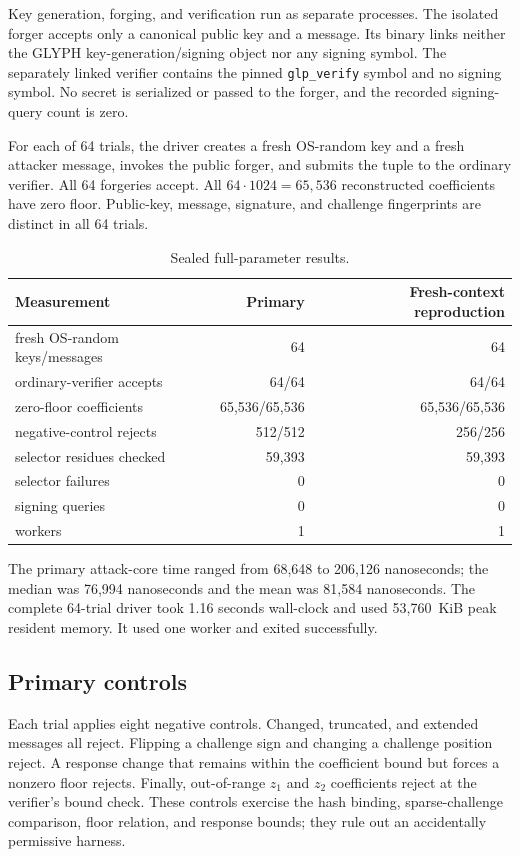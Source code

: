 \documentclass[10pt,a4paper]{article}
\begin{document}
Key generation, forging, and verification run as separate processes.  The
isolated forger accepts only a canonical public key and a message.  Its
binary links neither the GLYPH key-generation/signing object nor any signing
symbol.  The separately linked verifier contains the pinned
\texttt{glp\_verify} symbol and no signing symbol.  No secret is serialized
or passed to the forger, and the recorded signing-query count is zero.

For each of 64 trials, the driver creates a fresh OS-random key and a fresh
attacker message, invokes the public forger, and submits the tuple to the
ordinary verifier.  All 64 forgeries accept.  All $64\cdot1024=65{,}536$
reconstructed coefficients have zero floor.  Public-key, message, signature,
and challenge fingerprints are distinct in all 64 trials.

\begin{table}[ht]
\centering
\caption{Sealed full-parameter results.}
\begin{tabular}{lrr}
\toprule
Measurement & Primary & Fresh-context reproduction \\
\midrule
fresh OS-random keys/messages & 64 & 64 \\
ordinary-verifier accepts & 64/64 & 64/64 \\
zero-floor coefficients & 65,536/65,536 & 65,536/65,536 \\
negative-control rejects & 512/512 & 256/256 \\
selector residues checked & 59,393 & 59,393 \\
selector failures & 0 & 0 \\
signing queries & 0 & 0 \\
workers & 1 & 1 \\
\bottomrule
\end{tabular}
\end{table}

The primary attack-core time ranged from 68,648 to 206,126 nanoseconds; the
median was 76,994 nanoseconds and the mean was 81,584 nanoseconds.  The
complete 64-trial driver took 1.16 seconds wall-clock and used 53,760~KiB
peak resident memory.  It used one worker and exited successfully.

\subsection{Primary controls}

Each trial applies eight negative controls.  Changed, truncated, and extended
messages all reject.  Flipping a challenge sign and changing a challenge
position reject.  A response change that remains within the coefficient
bound but forces a nonzero floor rejects.  Finally, out-of-range $z_1$ and
$z_2$ coefficients reject at the verifier's bound check.  These controls
exercise the hash binding, sparse-challenge comparison, floor relation, and
response bounds; they rule out an accidentally permissive harness.
\end{document}
